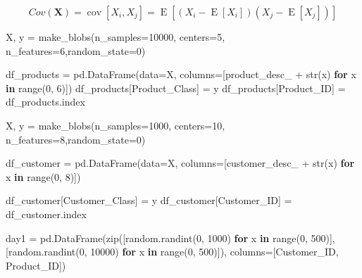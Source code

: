 \documentclass[]{tufte-book}
\newenvironment{Shaded}{}{}
\newcommand{\BuiltInTok}[1]{#1}
\newcommand{\ControlFlowTok}[1]{\textcolor[rgb]{0.00,0.44,0.13}{\textbf{#1}}}
\newcommand{\DecValTok}[1]{\textcolor[rgb]{0.25,0.63,0.44}{#1}}
\newcommand{\KeywordTok}[1]{\textcolor[rgb]{0.00,0.44,0.13}{\textbf{#1}}}
\newcommand{\NormalTok}[1]{#1}
\newcommand{\OperatorTok}[1]{\textcolor[rgb]{0.40,0.40,0.40}{#1}}
\newcommand{\StringTok}[1]{\textcolor[rgb]{0.25,0.44,0.63}{#1}}
\theoremstyle{definition}
\theoremstyle{definition}
\theoremstyle{definition}
\theoremstyle{remark}
\begin{document}
\[ Cov(\mathbf{X}) = \operatorname{cov}[X_i, X_j] = \operatorname{E}[(X_i - \operatorname{E}[X_i])(X_j - \operatorname{E}[X_j])] \]

\begin{Shaded}
\begin{Highlighting}[]
\NormalTok{X, y }\OperatorTok{=}\NormalTok{ make\_blobs(n\_samples}\OperatorTok{=}\DecValTok{10000}\NormalTok{, }
\NormalTok{centers}\OperatorTok{=}\DecValTok{5}\NormalTok{, n\_features}\OperatorTok{=}\DecValTok{6}\NormalTok{,random\_state}\OperatorTok{=}\DecValTok{0}\NormalTok{)}

\NormalTok{df\_products }\OperatorTok{=}\NormalTok{ pd.DataFrame(data}\OperatorTok{=}\NormalTok{X,}
\NormalTok{  columns}\OperatorTok{=}\NormalTok{[}\StringTok{\textquotesingle{}product\_desc\_\textquotesingle{}} \OperatorTok{+} \BuiltInTok{str}\NormalTok{(x) }\ControlFlowTok{for}\NormalTok{ x }\KeywordTok{in} \BuiltInTok{range}\NormalTok{(}\DecValTok{0}\NormalTok{, }\DecValTok{6}\NormalTok{)])}
\NormalTok{df\_products[}\StringTok{\textquotesingle{}Product\_Class\textquotesingle{}}\NormalTok{] }\OperatorTok{=}\NormalTok{ y}
\NormalTok{df\_products[}\StringTok{\textquotesingle{}Product\_ID\textquotesingle{}}\NormalTok{] }\OperatorTok{=}\NormalTok{ df\_products.index}

\NormalTok{X, y }\OperatorTok{=}\NormalTok{ make\_blobs(n\_samples}\OperatorTok{=}\DecValTok{1000}\NormalTok{, centers}\OperatorTok{=}\DecValTok{10}\NormalTok{, }
\NormalTok{      n\_features}\OperatorTok{=}\DecValTok{8}\NormalTok{,random\_state}\OperatorTok{=}\DecValTok{0}\NormalTok{)}

\NormalTok{df\_customer }\OperatorTok{=}\NormalTok{ pd.DataFrame(data}\OperatorTok{=}\NormalTok{X,}
\NormalTok{columns}\OperatorTok{=}\NormalTok{[}\StringTok{\textquotesingle{}customer\_desc\_\textquotesingle{}} \OperatorTok{+} \BuiltInTok{str}\NormalTok{(x) }\ControlFlowTok{for}\NormalTok{ x }\KeywordTok{in} \BuiltInTok{range}\NormalTok{(}\DecValTok{0}\NormalTok{, }\DecValTok{8}\NormalTok{)])}

\NormalTok{df\_customer[}\StringTok{\textquotesingle{}Customer\_Class\textquotesingle{}}\NormalTok{] }\OperatorTok{=}\NormalTok{ y}
\NormalTok{df\_customer[}\StringTok{\textquotesingle{}Customer\_ID\textquotesingle{}}\NormalTok{] }\OperatorTok{=}\NormalTok{ df\_customer.index}

\NormalTok{day1 }\OperatorTok{=}\NormalTok{ pd.DataFrame(}\BuiltInTok{zip}\NormalTok{([random.randint(}\DecValTok{0}\NormalTok{, }\DecValTok{1000}\NormalTok{) }\ControlFlowTok{for} 
\NormalTok{x }\KeywordTok{in} \BuiltInTok{range}\NormalTok{(}\DecValTok{0}\NormalTok{, }\DecValTok{500}\NormalTok{)],[random.randint(}\DecValTok{0}\NormalTok{, }\DecValTok{10000}\NormalTok{) }\ControlFlowTok{for} 
\NormalTok{x }\KeywordTok{in} \BuiltInTok{range}\NormalTok{(}\DecValTok{0}\NormalTok{, }\DecValTok{500}\NormalTok{)]), }
\NormalTok{columns}\OperatorTok{=}\NormalTok{[}\StringTok{\textquotesingle{}Customer\_ID\textquotesingle{}}\NormalTok{, }\StringTok{\textquotesingle{}Product\_ID\textquotesingle{}}\NormalTok{])}


\end{Highlighting}
\end{Shaded}
\end{document}
